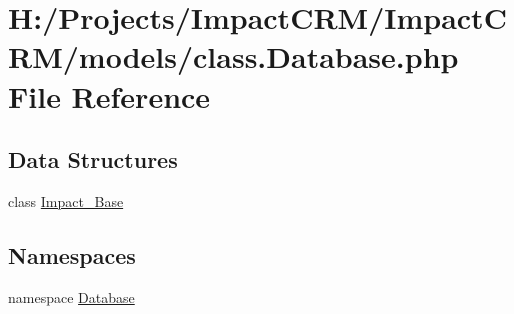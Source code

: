 \hypertarget{class_8Database_8php}{
\section{H:/Projects/ImpactCRM/ImpactCRM/models/class.Database.php File Reference}
\label{class_8Database_8php}
}
\subsection*{Data Structures}
\begin{DoxyCompactItemize}
\item 
class \hyperlink{classImpact__Base}{Impact\_\-Base}
\end{DoxyCompactItemize}
\subsection*{Namespaces}
\begin{DoxyCompactItemize}
\item 
namespace \hyperlink{namespaceDatabase}{Database}
\end{DoxyCompactItemize}
